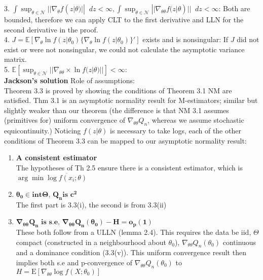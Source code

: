 \documentclass[11pt,letterpaper]{article}                  %
\newcommand*\diff{\mathop{}\!d} %
\begin{document}
\begin{problem}
3. $\int \sup_{\theta \in \mathcal{N}} || \nabla_\theta f(z|\theta) || \diff z < \infty, \int \sup_{\theta \in \mathcal{N}} || \nabla_{\theta \theta} f(z|\theta) || \diff z < \infty$: Both are bounded, therefore we can apply CLT to the first derivative and LLN for the second derivative in the proof.\\

4. $J = \mathbb{E} [\nabla_\theta \ln f(z|\theta_0) \{\nabla_\theta \ln f(z|\theta_0)  \}' ]$ exists and is nonsingular: If $J$ did not exist or were not nonsingular, we could not calculate the asymptotic variance matrix.\\

5. $ \mathbb{E} [ \sup_{\theta \in \mathcal{N}} || \nabla_{\theta \theta}  \times \ln f(z|\theta)||] < \infty$: \\

\textbf{Jackson's solution}
Role of assumptions: \\

Theorem 3.3 is proved by showing the conditions of Theorem 3.1
NM are satisfied. Thm 3.1 is an asymptotic normality result for
M-estimators; similar but slightly weaker than our 
theorem (the difference is that NM 3.1 assumes (primitives for)
uniform convergence of $\nabla_{\theta\theta} Q_n$, whereas we assume
stochastic equicontinuity.) Noticing $f(z|\theta)$ is necessary to
take logs, each of the other conditions of Theorem 3.3
can be mapped to our asymptotic normality result:

\begin{enumerate}
\item \textbf{A consistent estimator} \\The hypotheses of Th 2.5
  ensure there is a consistent estimator, which is $\arg\min
  \overline{\log f(x_i; \theta)}$

\item $\mathbf{\theta_0 \in \textbf{int}\Theta\textbf{, }Q_n \textbf{
      is }c^2}$ \\
The first part is 3.3(i), the second is from 3.3(ii) 

\item $\mathbf{\nabla_{\theta\theta} Q_n \textbf{ is s.e, }
    \nabla_{\theta\theta} Q_n(\theta_0) - H = o_p(1)}$ \\
These both follow from a ULLN (lemma 2.4). This requires
the data be iid, $\Theta$ compact (constructed in a neighbourhood
about $\theta_0$), $\nabla_{\theta\theta}
Q_n(\theta_0)$ continuous and a dominance condition (3.3(v)). This
uniform convergence result then implies both s.e and p-convergence of $\nabla_{\theta\theta} Q_n(\theta_0)$ to $H =
\mathrm{E}[\nabla_{\theta\theta} \log f(X;\theta_0)]$


\end{enumerate}
\end{problem}
\end{document}
